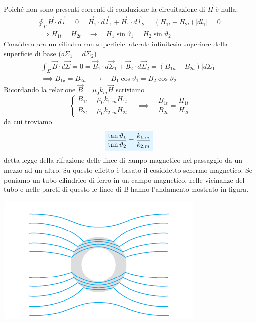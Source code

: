 \documentclass[x11names]{report}
\newcommand{\viola}[1]{%
	\colorbox{myblue}{$\displaystyle #1$}
}
\begin{document}
Poiché non sono presenti correnti di conduzione la circuitazione di \(\vec{H}\) è nulla:
\begin{gather*}
	\oint_\Gamma \vec{H} \cdot d\vec{l} = 0 = \vec{H}_1 \cdot d\vec{l}_1 + \vec{H}_1 \cdot d\vec{l}_2 = (H_{1t} - H_{2t})|dl_1| = 0 \\
	\implies H_{1t} = H_{2t} \quad \to \quad H_1\sin\vartheta_1 = H_2\sin\vartheta_2
\end{gather*}
Considero ora un cilindro con superficie laterale infinitesio superiore della superficie di base (\(d\Sigma_1 = d\Sigma_2\))
\begin{gather*}
	\int_\Sigma \vec{B} \cdot d\vec{\Sigma} = 0 = \vec{B}_1 \cdot d\vec{\Sigma}_1 + \vec{B}_2 \cdot d\vec{\Sigma}_2 = (B_{1n} - B_{2n}) |d\Sigma_1| \\
	\implies B_{1n} = B_{2n} \quad \to \quad B_1\cos\vartheta_1 = B_2\cos\vartheta_2
\end{gather*}
Ricordando la relazione \(\vec{B} = \mu_0 k_m \vec{H}\) scriviamo
\[
\begin{cases}
	B_{1t} = \mu_0 k_{1,m} H_{1t} \\
	B_{2t} = \mu_0 k_{2,m} H_{2t}
\end{cases} \quad \implies \quad
\frac{B_{1t}}{B_{2t}} = \frac{H_{1t}}{H_{2t}}
\]
da cui troviamo
\begin{equation}
	\viola{\frac{\tan\vartheta_1}{\tan\vartheta_2} = \frac{k_{1,m}}{k_{2,m}}}
\end{equation}
detta legge della rifrazione delle linee di campo magnetico nel passaggio da un mezzo ad un altro. Su questo effetto è basato il cosiddetto schermo magnetico. Se poniamo un tubo cilindrico di ferro in un campo magnetico, nelle vicinanze del tubo e nelle pareti di questo le linee di B hanno l’andamento mostrato in figura.
\begin{center}
	\includegraphics[scale=0.5]{img/schermo.png}
\end{center}
\end{document}
